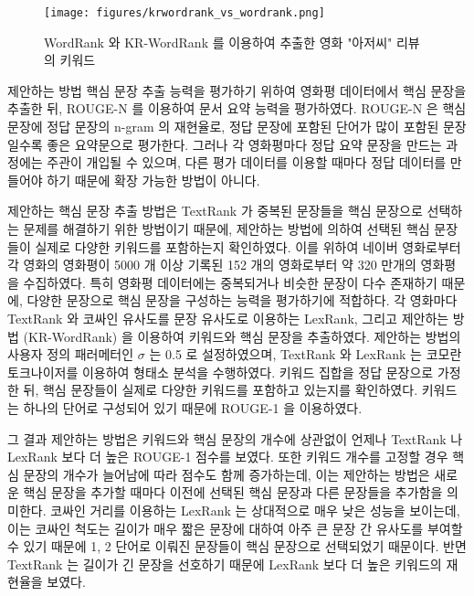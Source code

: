 \documentclass[11pt]{article}
\begin{document}
\begin{figure}[H]
\centering
\label{fig:krwordrank_vs_wordrank}
\texttt{[image: figures/krwordrank\_vs\_wordrank.png]}
\caption{WordRank 와 KR-WordRank 를 이용하여 추출한 영화 "아저씨" 리뷰의 키워드}
\end{figure}

제안하는 방법 핵심 문장 추출 능력을 평가하기 위하여 영화평 데이터에서 핵심 문장을 추출한 뒤, ROUGE-N \citep{lin2004rouge} 를 이용하여 문서 요약 능력을 평가하였다.
ROUGE-N 은 핵심 문장에 정답 문장의 n-gram 의 재현율로, 정답 문장에 포함된 단어가 많이 포함된 문장일수록 좋은 요약문으로 평가한다.
그러나 각 영화평마다 정답 요약 문장을 만드는 과정에는 주관이 개입될 수 있으며, 다른 평가 데이터를 이용할 때마다 정답 데이터를 만들어야 하기 때문에 확장 가능한 방법이 아니다.

제안하는 핵심 문장 추출 방법은 TextRank 가 중복된 문장들을 핵심 문장으로 선택하는 문제를 해결하기 위한 방법이기 때문에, 제안하는 방법에 의하여 선택된 핵심 문장들이 실제로 다양한 키워드를 포함하는지 확인하였다.
이를 위하여 네이버 영화로부터 각 영화의 영화평이 5000 개 이상 기록된 152 개의 영화로부터 약 320 만개의 영화평을 수집하였다.
특히 영화평 데이터에는 중복되거나 비슷한 문장이 다수 존재하기 때문에, 다양한 문장으로 핵심 문장을 구성하는 능력을 평가하기에 적합하다.
각 영화마다 TextRank 와 코싸인 유사도를 문장 유사도로 이용하는 LexRank, 그리고 제안하는 방법 (KR-WordRank) 을 이용하여 키워드와 핵심 문장을 추출하였다.
제안하는 방법의 사용자 정의 패러메터인 $\sigma$ 는 0.5 로 설정하였으며, TextRank 와 LexRank 는 코모란 토크나이저를 이용하여 형태소 분석을 수행하였다.
키워드 집합을 정답 문장으로 가정한 뒤, 핵심 문장들이 실제로 다양한 키워드를 포함하고 있는지를 확인하였다.
키워드는 하나의 단어로 구성되어 있기 때문에 ROUGE-1 을 이용하였다.

그 결과 제안하는 방법은 키워드와 핵심 문장의 개수에 상관없이 언제나 TextRank 나 LexRank 보다 더 높은 ROUGE-1 점수를 보였다.
또한 키워드 개수를 고정할 경우 핵심 문장의 개수가 늘어남에 따라 점수도 함께 증가하는데, 이는 제안하는 방법은 새로운 핵심 문장을 추가할 때마다 이전에 선택된 핵심 문장과 다른 문장들을 추가함을 의미한다.
코싸인 거리를 이용하는 LexRank 는 상대적으로 매우 낮은 성능을 보이는데, 이는 코싸인 척도는 길이가 매우 짧은 문장에 대하여 아주 큰 문장 간 유사도를 부여할 수 있기 때문에 1, 2 단어로 이뤄진 문장들이 핵심 문장으로 선택되었기 때문이다.
반면 TextRank 는 길이가 긴 문장을 선호하기 때문에 LexRank 보다 더 높은 키워드의 재현율을 보였다.
\end{document}
